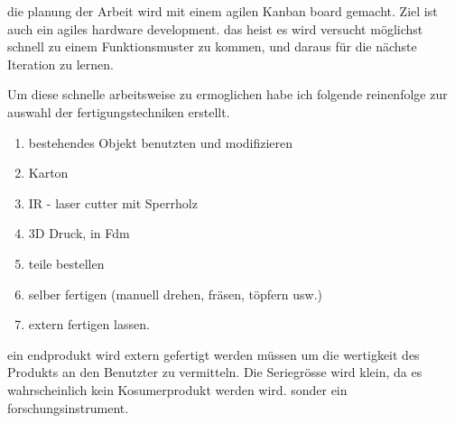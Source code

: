 die planung der Arbeit wird mit einem agilen Kanban board gemacht. Ziel ist auch ein agiles hardware development. das heist es wird versucht möglichst schnell zu einem Funktionsmuster zu kommen, und daraus für die nächste Iteration zu lernen.

Um diese schnelle arbeitsweise zu ermoglichen habe ich folgende reinenfolge zur auswahl der fertigungstechniken erstellt.

\begin{enumerate}
\item bestehendes Objekt benutzten und modifizieren
\item Karton
\item IR - laser cutter mit Sperrholz
\item 3D Druck, in Fdm
\item teile bestellen
\item selber fertigen (manuell drehen, fräsen, töpfern usw.)
\item extern fertigen lassen.
\end{enumerate}

ein endprodukt wird extern gefertigt werden müssen um die wertigkeit des Produkts an den Benutzter zu vermitteln. Die Seriegrösse wird klein, da es wahrscheinlich kein Kosumerprodukt werden wird. sonder ein forschungsinstrument.
